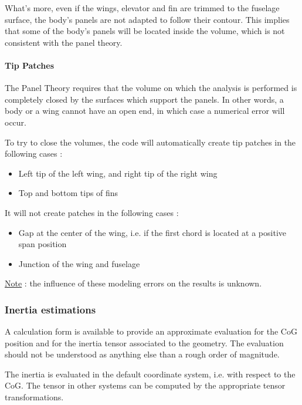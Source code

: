 \documentclass[a4paper,twoside,12pt,dvips]{article}
\begin{document}
What's more, even if the wings, elevator and fin are trimmed to the
fuselage surface, the body's panels are not adapted to follow their
contour. This implies that some of the body's panels will be located
inside the volume, which is not consistent with the panel theory.

\paragraph{Tip Patches}

The Panel Theory requires that the volume on which the analysis is
performed is completely closed by the surfaces which support the
panels. In other words, a body or a wing cannot have an open end, in
which case a numerical error will occur.

To try to close the volumes, the code will automatically create tip
patches in the following cases :

\begin{itemize}
\item Left tip of the left wing, and right tip of the right wing
\item Top and bottom tips of fins
\end{itemize}

It will not create patches in the following cases :

\begin{itemize}
\item Gap at the center of the wing, i.e. if the first chord is
located at a positive span position
\item Junction of the wing and fuselage
\end{itemize}

\underline{Note} : the influence of these modeling errors on the results
is unknown.

\subsubsection{Inertia estimations}

A calculation form is available to provide an approximate evaluation
for the CoG position and for the inertia tensor associated to the
geometry.  The evaluation should not be understood as anything else
than a rough order of magnitude.

The inertia is evaluated in the default coordinate system, i.e. with
respect to the CoG. The tensor in other systems can be computed by the
appropriate tensor transformations.
\end{document}
